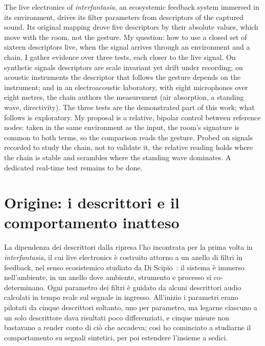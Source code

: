 \documentclass{article}
\title{\papertitle}
\newcommand{\brano}{\emph{interfantasia}}
\begin{document}
%
\maketitle

\abstract
The live electronics of \brano, an ecosystemic feedback system immersed in its environment, drives its filter parameters from descriptors of the captured sound. Its original mapping drove five descriptors by their absolute values, which move with the room, not the gesture. My question: how to use a closed set of sixteen descriptors live, when the signal arrives through an environment and a chain. I gather evidence over three tests, each closer to the live signal. On synthetic signals descriptors are scale invariant yet drift under recording; on acoustic instruments the descriptor that follows the gesture depends on the instrument; and in an electroacoustic laboratory, with eight microphones over eight metres, the chain authors the measurement (air absorption, a standing wave, directivity). The three tests are the demonstrated part of this work; what follows is exploratory. My proposal is a relative, bipolar control between reference nodes: taken in the same environment as the input, the room's signature is common to both terms, so the comparison reads the gesture. Probed on signals recorded to study the chain, not to validate it, the relative reading holds where the chain is stable and scrambles where the standing wave dominates. A dedicated real-time test remains to be done.
\endabstract
{}

\section{Origine: i descrittori e il comportamento inatteso}\label{sec:origine}

La dipendenza dei descrittori dalla ripresa l'ho incontrata per la prima volta in \brano, il cui live electronics è costruito attorno a un anello di filtri in feedback, nel senso ecosistemico studiato da Di Scipio~\cite{discipio2003sound}: il sistema %
è immerso nell'ambiente, in un anello dove ambiente, strumento e processo si co-determinano. Ogni parametro dei filtri è guidato da alcuni descrittori audio calcolati in tempo reale sul segnale in ingresso. All'inizio i parametri erano pilotati da cinque descrittori soltanto, uno per parametro, ma legarne ciascuno a un solo descrittore dava risultati poco differenziati, e cinque misure non bastavano a render conto di ciò che accadeva; così ho cominciato a studiarne il comportamento su segnali sintetici, per poi estendere l'insieme a sedici.
\end{document}
